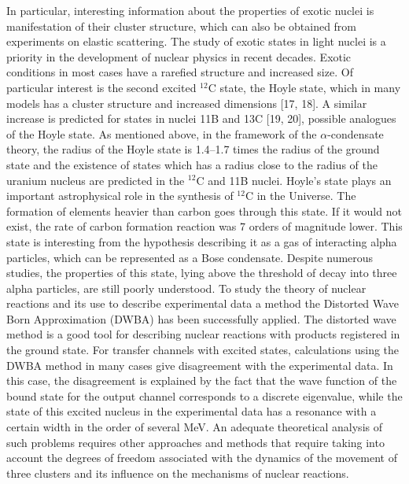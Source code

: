 \documentclass[
12pt, %
oneside, %
english, %
onehalfspacing, %
headsepline, %
]{MastersDoctoralThesis} %
\begin{document}
In particular, interesting information about the properties of exotic nuclei is manifestation of their cluster structure, which can also be obtained from experiments on elastic scattering. The study of exotic states in light nuclei is a priority in the development of nuclear physics in recent decades. Exotic conditions in most cases have a rarefied structure and increased size. Of particular interest is the second excited $^{12}$C state, the Hoyle state, which in many models has a cluster structure and increased dimensions [17, 18]. A similar increase is predicted for states in nuclei 11B and 13C [19, 20], possible analogues of the Hoyle state. As mentioned above, in the framework of the $\alpha$-condensate theory, the radius of the Hoyle state is 1.4–1.7 times the radius of the ground state and the existence of states which has a radius close to the radius of the uranium nucleus are predicted in the $^{12}$C and 11B nuclei.
Hoyle's state plays an important astrophysical role in the synthesis of $^{12}$C in the Universe. The formation of elements heavier than carbon goes through this state. If it would not exist, the rate of carbon formation reaction was 7 orders of magnitude lower. This state is interesting from the hypothesis describing it as a gas of interacting alpha particles, which can be represented as a Bose condensate. Despite numerous studies, the properties of this state, lying above the threshold of decay into three alpha particles, are still poorly understood.
To study the theory of nuclear reactions and its use to describe experimental data a method the Distorted Wave Born Approximation (DWBA) has been successfully applied. The distorted wave method is a good tool for describing nuclear reactions with products registered in the ground state. For transfer channels with excited states, calculations using the DWBA method in many cases give disagreement with the experimental data. In this case, the disagreement is explained by the fact that the wave function of the bound state for the output channel corresponds to a discrete eigenvalue, while the state of this excited nucleus in the experimental data has a resonance with a certain width in the order of several MeV. An adequate theoretical analysis of such problems requires other approaches and methods that require taking into account the degrees of freedom associated with the dynamics of the movement of three clusters and its influence on the mechanisms of nuclear reactions.
\end{document}
